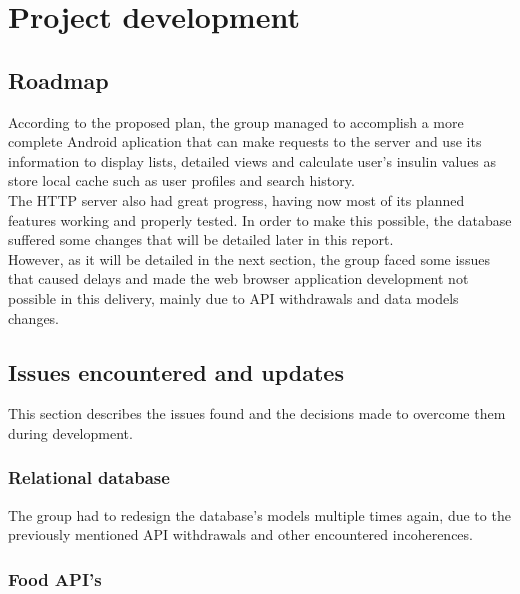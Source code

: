 %
%
\chapter{Project development}
    
	\section{Roadmap}

    According to the proposed plan, the group managed to accomplish a more complete Android aplication 
    that can make requests to the server and use its information to display lists,
    detailed views and calculate user's insulin values as store local cache such as 
    user profiles and search history.\\

    The HTTP server also had great progress, having now most of its planned features working and properly tested. In order
    to make this possible, the database suffered some changes that will be detailed later in this report.\\

    However, as it will be detailed in the next section, the group faced some issues that caused
    delays and made the web browser application development not possible in this delivery, mainly due to API
    withdrawals and data models changes.\\

    \section{Issues encountered and updates}

    This section describes the issues found and the decisions made
    to overcome them during development.
    
    \subsection{Relational database}

    The group had to redesign the database's models multiple times again, due to the previously mentioned API withdrawals and other encountered
    incoherences.\\    

    \subsection{Food API's}

